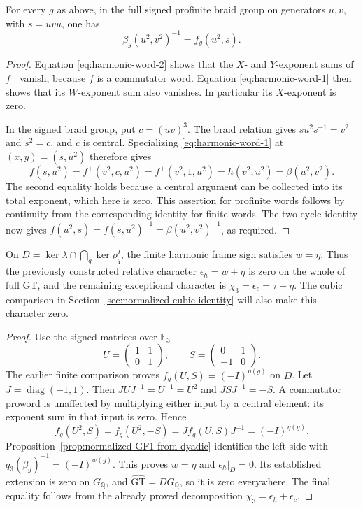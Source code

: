 \begin{proposition}\label{prop:normalized-GF1-from-dyadic}
For every $g$ as above, in the full signed profinite braid group
on generators $u,v$, with $s=uvu$, one has
\[
 \beta_g(u^2,v^2)^{-1}=f_g(u^2,s).
 \tag{GF1$_0$}
\]
\end{proposition}
\begin{proof}
Equation \eqref{eq:harmonic-word-2} shows that the $X$- and $Y$-exponent sums
of $f^+$ vanish, because $f$ is a commutator word.
Equation \eqref{eq:harmonic-word-1} then shows that its $W$-exponent sum also
vanishes. In particular its $X$-exponent is zero.

In the signed braid group, put $c=(uv)^3$.
The braid relation gives $su^2s^{-1}=v^2$ and $s^2=c$,
and $c$ is central. Specializing \eqref{eq:harmonic-word-1} at $(x,y)=(s,u^2)$
therefore gives
\[
 f(s,u^2)=f^+(v^2,c,u^2)=f^+(v^2,1,u^2)
         =h(v^2,u^2)=\beta(u^2,v^2).
\]
The second equality holds because a central argument can
be collected into its total exponent, which here is zero.
This assertion for profinite words follows by continuity
from the corresponding identity for finite words.
The two-cycle identity now gives
$f(u^2,s)=f(s,u^2)^{-1}=\beta(u^2,v^2)^{-1}$,
as required.
\end{proof}

\begin{corollary}\label{cor:harmonic-defect-zero}
On $D=\ker\lambda\cap\bigcap_q\ker\rho_q^I$, the finite
harmonic frame sign satisfies $w=\eta$.  Thus the previously
constructed relative character $\epsilon_h=w+\eta$ is zero
on the whole of full GT, and the remaining exceptional
character is $\chi_3=\epsilon_c=\tau+\eta$.
The cubic comparison in Section~\ref{sec:normalized-cubic-identity}
will also make this character zero.
\end{corollary}
\begin{proof}
Use the signed matrices over $\mathbb F_3$
\[
 U=\begin{pmatrix}1&1\\0&1\end{pmatrix},\qquad
 S=\begin{pmatrix}0&1\\-1&0\end{pmatrix}.
\]
The earlier finite comparison proves
$f_g(U,S)=(-I)^{\eta(g)}$ on $D$.
Let $J=\operatorname{diag}(-1,1)$.  Then
$JUJ^{-1}=U^{-1}=U^2$ and $JSJ^{-1}=-S$.
A commutator proword is unaffected by multiplying either
input by a central element: its exponent sum in that input
is zero.  Hence
\[
 f_g(U^2,S)=f_g(U^2,-S)
          =Jf_g(U,S)J^{-1}=(-I)^{\eta(g)}.
\]
Proposition~\ref{prop:normalized-GF1-from-dyadic} identifies
the left side with $q_3(\beta_g)^{-1}=(-I)^{w(g)}$.
This proves $w=\eta$ and $\epsilon_h|_D=0$.
Its established extension is zero on $G_{\mathbb Q}$, and
$\widehat{\mathrm{GT}}=D G_{\mathbb Q}$, so it is zero
everywhere.  The final equality follows from the already
proved decomposition $\chi_3=\epsilon_h+\epsilon_c$.
\end{proof}
